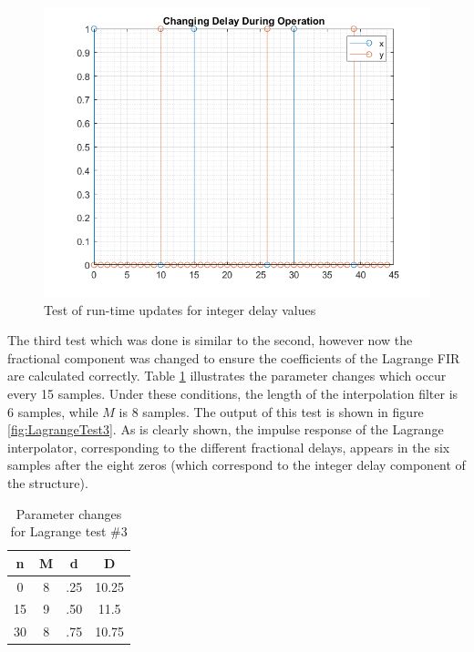 \documentclass[../main.tex]{subfiles}
\begin{document}
\begin{figure}[h]
    \centering
    \includegraphics[scale=.65]{./images/plots/LagrangeTest2.png}
    \caption{Test of run-time updates for integer delay values}
    \label{fig:LagrangeTest2}
\end{figure}

The third test which was done is similar to the second, however now the fractional component was changed to ensure the coefficients of the Lagrange FIR are calculated correctly. Table \ref{tab:LagrangeTest3} illustrates the parameter changes which occur every 15 samples. Under these conditions, the length of the interpolation filter is 6 samples, while $M$ is 8 samples. The output of this test is shown in figure \ref{fig:LagrangeTest3}. As is clearly shown, the impulse response of the Lagrange interpolator, corresponding to the different fractional delays, appears in the six samples after the eight zeros (which correspond to the integer delay component of the structure).

\begin{table}[h!]
    \centering
     \begin{tabular}{||c| |c |c |c|} 
         \hline
         \textbf{n} & \textbf{M} & \textbf{d} & \textbf{D} \\ [0.5ex] 
         \hline
         0 & 8 & .25 & 10.25 \\ 
         \hline
         15 & 9 & .50 & 11.5 \\
         \hline
         30 & 8 & .75 & 10.75 \\
         \hline
     \end{tabular}
    \caption{Parameter changes for Lagrange test \#3}
    \label{tab:LagrangeTest3}
\end{table}
\end{document}
